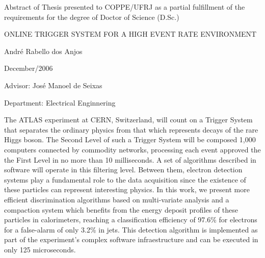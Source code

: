 \clearpage

\noindent
Abstract of Thesis presented to COPPE/UFRJ as a partial fulfillment of the
\linebreak requirements for the degree of Doctor of Science (D.Sc.)

\vspace{1.5cm}

\begin{center}
ONLINE TRIGGER SYSTEM FOR A HIGH EVENT RATE ENVIRONMENT 
\vspace{1cm}

André Rabello dos Anjos
\vspace{1cm}

December/2006
\end{center}
\vspace{2cm}

\noindent
Advisor: José Manoel de Seixas
\vspace{2cm}

\noindent
Department: Electrical Enginnering
\vspace{2cm}

\noindent \begin{summary}{1.2}
\hspace{0.8cm}The ATLAS experiment at CERN, Switzerland, will count on a
Trigger System that separates the ordinary physics from that which represents
decays of the rare Higgs boson. The Second Level of such a Trigger System will
be composed 1,000 computers connected by commodity networks, processing each
event approved the the First Level in no more than 10 milliseconds. A set of
algorithms described in software will operate in this filtering level. Between
them, electron detection systems play a fundamental role to the data
acquisition since the existence of these particles can represent interesting
physics. In this work, we present more efficient discrimination algorithms
based on multi-variate analysis and a compaction system which benefits from
the energy deposit profiles of these particles in calorimeters, reaching a
classification efficiency of 97.6\% for electrons for a false-alarm of only
3.2\% in jets. This detection algorithm is implemented as part of the
experiment's complex software infraestructure and can be executed in only 125
microseconds.
\end{summary}
